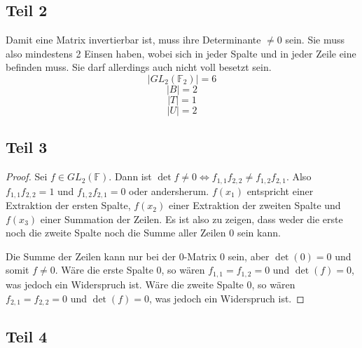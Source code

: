 \documentclass[10pt,a4paper]{article}
\begin{document}
\subsection{Teil 2}

Damit eine Matrix invertierbar ist, muss ihre Determinante $\ne 0$ sein.
Sie muss also mindestens 2 Einsen haben, wobei sich in jeder Spalte und in jeder Zeile eine befinden muss.
Sie darf allerdings auch nicht voll besetzt sein.
\begin{equation}
  |GL_{2}(\mathbb{F}_{2})| = 6
\end{equation}
\begin{equation}
  |B| = 2
\end{equation}
\begin{equation}
  |T| = 1
\end{equation}
\begin{equation}
  |U| = 2
\end{equation}

\subsection{Teil 3}

\begin{proof}
  Sei $f \in GL_{2}(\mathbb{F})$.
  Dann ist $\det f \ne 0 \Leftrightarrow f_{1,1}f_{2,2} \ne f_{1,2}f_{2,1}$.
  Also $f_{1,1}f_{2,2} = 1$ und $f_{1,2}f_{2,1} = 0$ oder andersherum.
  $f(x_{1})$ entspricht einer Extraktion der ersten Spalte, $f(x_{2})$ einer Extraktion der zweiten Spalte und $f(x_{3})$ einer Summation der Zeilen.
  Es ist also zu zeigen, dass weder die erste noch die zweite Spalte noch die Summe aller Zeilen $0$ sein kann.

  Die Summe der Zeilen kann nur bei der $0$-Matrix $0$ sein, aber $\det(0) = 0$ und somit $f \ne 0$.
  Wäre die erste Spalte $0$, so wären $f_{1,1} = f_{1,2} = 0$ und $\det(f) = 0$, was jedoch ein Widerspruch ist.
  Wäre die zweite Spalte $0$, so wären $f_{2,1} = f_{2,2} = 0$ und $\det(f) = 0$, was jedoch ein Widerspruch ist.
\end{proof}

\subsection{Teil 4}
\end{document}

